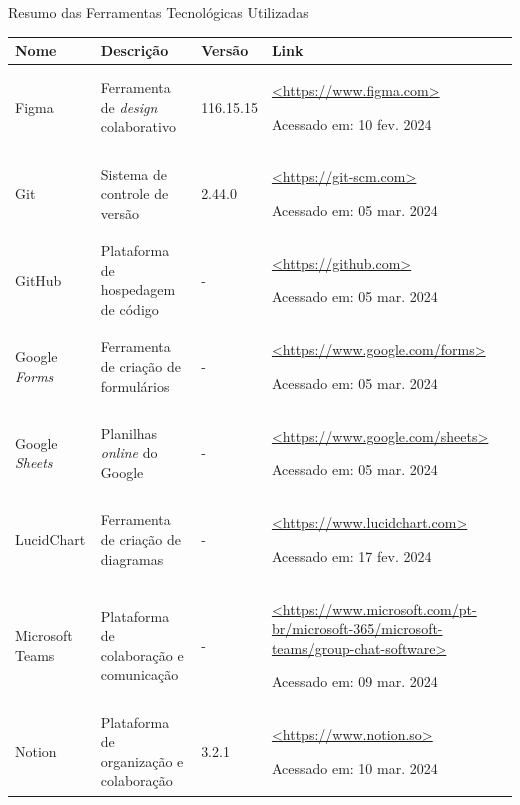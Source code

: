 \begin{quadro}
\caption{\label{FerramentasTecnologicas}Resumo das Ferramentas Tecnológicas Utilizadas}
\centering

\begin{tabular}{|p{2.5cm}|p{5cm}|p{1.7cm}|p{6.4cm}|}
\hline
\textbf{Nome} & \textbf{Descrição} & \textbf{Versão} & \textbf{Link}                    \\ \hline
Figma                  & Ferramenta de \textit{design} colaborativo & 116.15.15                   & \href{https://www.figma.com}{<https://www.figma.com>} \par Acessado em: 10 fev. 2024 \\ \hline
Git                    & Sistema de controle de versão & 2.44.0                   & \href{https://git-scm.com}{<https://git-scm.com>} \par Acessado em: 05 mar. 2024 \\ \hline
GitHub                 & Plataforma de hospedagem de código & -                   & \href{https://github.com}{<https://github.com>} \par Acessado em: 05 mar. 2024 \\ \hline
Google \textit{Forms}           & Ferramenta de criação de formulários & -                   & \href{https://www.google.com/forms}{<https://www.google.com/forms>} \par Acessado em: 05 mar. 2024 \\ \hline
Google \textit{Sheets}          & Planilhas \textit{online} do Google & -                   & \href{https://www.google.com/sheets}{<https://www.google.com/sheets>} \par Acessado em: 05 mar. 2024 \\ \hline
LucidChart             & Ferramenta de criação de diagramas & -                   & \href{https://www.lucidchart.com}{<https://www.lucidchart.com>} \par Acessado em: 17 fev. 2024 \\ \hline
Microsoft Teams        & Plataforma de colaboração e comunicação & -                   & \href{https://www.microsoft.com/pt-br/microsoft-365/microsoft-teams/group-chat-software}{<https://www.microsoft.com/pt-br/microsoft-365/microsoft-teams/group-chat-software>} \par Acessado em: 09 mar. 2024 \\ \hline
Notion                 & Plataforma de organização e colaboração & 3.2.1                   & \href{https://www.notion.so}{<https://www.notion.so>} \par Acessado em: 10 mar. 2024 \\ \hline

\end{tabular}
\end{quadro}
